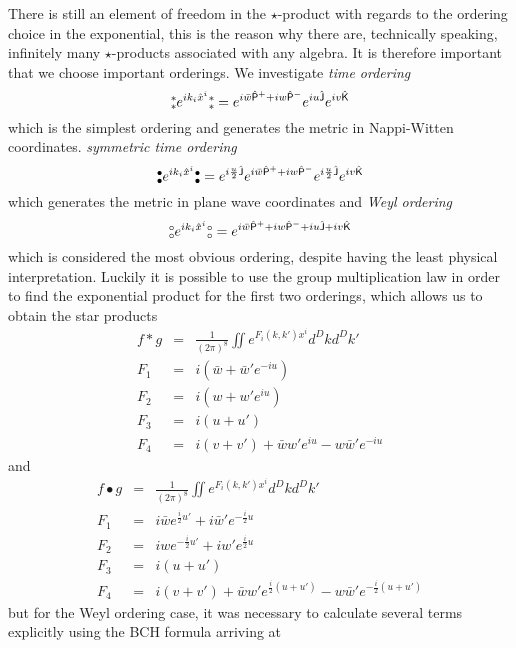 \documentclass[a4,12pt,titlepage]{seminar}
\def\P{{\sf P}} \def\K{{\sf K}} \def\J{{\sf J}} \def\T{{\sf FIXME}}
\newcommand{\NO}{\mbox{$\substack{\circ\\\circ}$}}      %
\newcommand{\NOa}{\mbox{$\substack{\ast\\\ast}$}}       %
\newcommand{\NOb}{\mbox{$\substack{\bullet\\\bullet}$}} %
\begin{document}
There is still an element of freedom in the $\star$-product with regards to the
ordering choice in the exponential, this is the reason why there are,
technically speaking, infinitely many $\star$-products associated with any
algebra. It is therefore important that we choose important orderings. We
investigate \textit{time ordering}
\begin{equation*}
  \NOa e^{ik_i\hat x^i}\NOa=e^{i\bar w\hat\P^++iw\hat\P^-}e^{iu\hat\J}e^{iv\hat\K}
\end{equation*}
which is the simplest ordering and generates the metric in Nappi-Witten
coordinates.
\textit{symmetric time ordering}
\begin{equation*}
  \NOb e^{ik_i\hat x^i}\NOb=e^{i\frac u2\hat\J}e^{i\bar w\hat\P^++iw\hat\P^-}
  e^{i\frac u2\hat\J}e^{iv\hat\K}
\end{equation*}
which generates the metric in plane wave coordinates
and \textit{Weyl ordering}
\begin{equation*}
  \NO e^{ik_i\hat x^i}\NO=e^{i\bar{w}\hat \P^++iw\hat \P^-+iu\hat \J+iv\hat\K}
\end{equation*}
which is considered the most obvious ordering, despite having the least physical
interpretation. Luckily it is possible to use the group multiplication law in
order to find the exponential product for the first two orderings, which allows
us to obtain the star products
\begin{eqnarray*}
  f\ast g&=&\frac{1}{(2\pi)^{8}}\iint e^{F_i(k,k')x^i}d^Dkd^Dk'\\ \nonumber
  F_1&=& i(\bar w+\bar w'e^{-i u})\\ \nonumber
  F_2&=& i(w + w'e^{i u})\\ \nonumber
  F_3&=& i(u+u')\\ \nonumber
  F_4&=& i(v+v')+\bar ww'e^{i u}-w\bar w'e^{-i u}
\end{eqnarray*}
and
\begin{eqnarray*}
  f\bullet g&=&\frac{1}{(2\pi)^{8}}\iint e^{F_i(k,k')x^i}d^Dkd^Dk'\\ \nonumber
  F_1&=&i\bar we^{\frac i2 u'}+i\bar w'e^{-\frac i2 u}\\ \nonumber
  F_2&=&iwe^{-\frac i2 u'}+iw'e^{\frac i2 u}\\ \nonumber
  F_3&=&i(u+u')\\ \nonumber
  F_4&=&i(v+v')+\bar ww'e^{\frac i2(u+u')}-w\bar w'e^{-\frac
    i2(u+u')}
\end{eqnarray*}
but for the Weyl ordering case, it was necessary to calculate several terms
explicitly using the BCH formula arriving at
\end{document}
